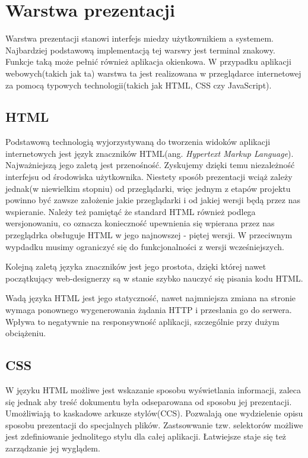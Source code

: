 \section[Warstwa prezentacji][Warstwa prezentacji]{Warstwa prezentacji}
Warstwa prezentacji stanowi interfejs miedzy użytkownikiem a systemem. Najbardziej podstawową implementacją tej warswy jest terminal znakowy. Funkcje taką może pełnić również aplikacja okienkowa. W przypadku aplikacji webowych(takich jak ta) warstwa ta jest realizowana w przeglądarce internetowej za pomocą typowych technologii(takich jak HTML, CSS czy JavaScript).

\subsection[HTML][HTML]{HTML}
Podstawową technologią wyjorzystywaną do tworzenia widoków aplikacji internetowych jest język znaczników HTML(ang. \textit{Hypertext Markup Language}). Najważniejszą jego zaletą jest przenośność. Zyskujemy dzięki temu niezależność interfejsu od środowiska użytkownika. Niestety sposób prezentacji wciąż zależy jednak(w niewielkim stopniu) od przeglądarki, więc jednym z etapów projektu powinno być zawsze założenie jakie przeglądarki i od jakiej wersji będą przez nas wspieranie. Należy też pamiętąć że standard HTML również podlega wersjonowaniu, co oznacza konieczność upewnienia się wpierana przez nas przeglądrka obsługuje HTML w jego najnowszej - piętej wersji. W przeciwnym wypdadku musimy ograniczyć się do funkcjonalności z wersji wcześniejszych.

Kolejną zaletą języka znaczników jest jego prostota, dzięki której nawet początkujący web-designerzy są w stanie szybko nauczyć się pisania kodu HTML.

Wadą języka HTML jest jego statyczność, nawet najmniejsza zmiana na stronie wymaga ponownego wygenerowania żądania HTTP i przesłania go do serwera. Wpływa to negatywnie na responsywność aplikacji, szczególnie przy dużym obciążeniu. 

\subsection[CSS][CSS]{CSS}
W języku HTML możliwe jest wskazanie sposobu wyświetlania informacji, zaleca się jednak aby treść dokumentu była odseparowana od sposobu jej prezentacji. Umożliwiają to kaskadowe arkusze stylów(CCS). Pozwalają one wydzielenie opisu sposobu prezentacji do specjalnych plików. Zastsowwanie tzw. selektorów możliwe jest zdefiniowanie jednolitego stylu dla całej aplikacji. Łatwiejsze staje się też zarządzanie jej wyglądem.

